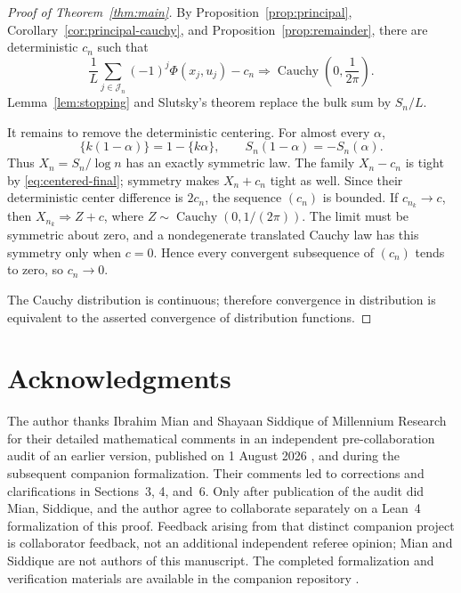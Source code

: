 \documentclass[11pt,a4paper]{amsart}
\theoremstyle{definition}
\theoremstyle{remark}
\begin{document}
\begin{proof}[Proof of Theorem~\ref{thm:main}]
By Proposition~\ref{prop:principal}, Corollary~\ref{cor:principal-cauchy},
and Proposition~\ref{prop:remainder}, there are deterministic $c_n$ such that
\begin{equation}\label{eq:centered-final}
 \frac1L\sum_{j\in\mathcal J_n}(-1)^j\Phi(x_j,u_j)-c_n
 \Longrightarrow \operatorname{Cauchy}\!\left(0,\frac1{2\pi}\right).
\end{equation}
Lemma~\ref{lem:stopping} and Slutsky's theorem replace the bulk sum by
$S_n/L$.

It remains to remove the deterministic centering.  For almost every
$\alpha$,
\[
 \{k(1-\alpha)\}=1-\{k\alpha\},
 \qquad S_n(1-\alpha)=-S_n(\alpha).
\]
Thus $X_n=S_n/\log n$ has an exactly symmetric law.  The family
$X_n-c_n$ is tight by \eqref{eq:centered-final}; symmetry makes
$X_n+c_n$ tight as well.  Since their deterministic center difference is
$2c_n$, the sequence $(c_n)$ is bounded.  If $c_{n_k}\to c$, then
$X_{n_k}\Rightarrow Z+c$, where
$Z\sim\operatorname{Cauchy}(0,1/(2\pi))$.  The limit must be symmetric about
zero, and a nondegenerate translated Cauchy law has this symmetry only when
$c=0$.  Hence every convergent subsequence of $(c_n)$ tends to zero, so
$c_n\to0$.

The Cauchy distribution is continuous; therefore convergence in distribution
is equivalent to the asserted convergence of distribution functions.
\end{proof}

\section*{Acknowledgments}

The author thanks Ibrahim Mian and Shayaan Siddique of Millennium Research for
their detailed mathematical comments in an independent pre-collaboration audit
of an earlier version, published on 1 August 2026 \cite{MianSiddique26}, and
during the subsequent companion formalization.  Their comments led to
corrections and clarifications in Sections~3, 4, and~6.  Only after publication
of the audit did Mian, Siddique, and the author agree to collaborate separately
on a Lean~4 formalization of this proof.  Feedback arising from that distinct
companion project is collaborator feedback, not an additional independent
referee opinion; Mian and Siddique are not authors of this manuscript.  The
completed formalization and verification materials are available in the
companion repository \cite{KwonMianSiddiqueLean26}.
\end{document}
